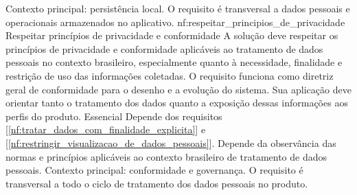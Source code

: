 {Contexto principal: persistência local. O requisito é transversal a dados pessoais e operacionais armazenados no aplicativo.}
\reqfuncfull
{nf:respeitar_principios_de_privacidade}
{Respeitar princípios de privacidade e conformidade}
{A solução deve respeitar os princípios de privacidade e conformidade aplicáveis ao tratamento de dados pessoais no contexto brasileiro, especialmente quanto à necessidade, finalidade e restrição de uso das informações coletadas. O requisito funciona como diretriz geral de conformidade para o desenho e a evolução do sistema. Sua aplicação deve orientar tanto o tratamento dos dados quanto a exposição dessas informações aos perfis do produto.}
{Essencial}
{Depende dos requisitos [\ref{nf:tratar_dados_com_finalidade_explicita}] e [\ref{nf:restringir_visualizacao_de_dados_pessoais}]. Depende da observância das normas e princípios aplicáveis ao contexto brasileiro de tratamento de dados pessoais.}
{Contexto principal: conformidade e governança. O requisito é transversal a todo o ciclo de tratamento dos dados pessoais no produto.}

